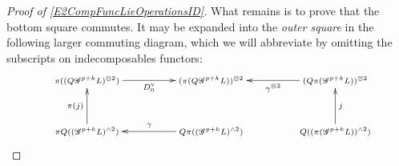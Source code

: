 \documentclass[11pt]{amsart}
\theoremstyle{plain}
\theoremstyle{definition}
\newcommand{\scrG}{\mathscr{G}}
\newcommand{\calW}{\mathcal{W}}
\theoremstyle{plain}
\newcommand{\BSW}{{\scrG}}
\begin{document}
\begin{Composite functor spectral sequences}
\begin{tricky proofs of operation compatibilities}
\begin{proof}[Proof of \ref{E2CompFuncLieOperationsID}]
What remains is to prove that the bottom square commutes. It may be expanded into the \emph{outer square} in the following larger commuting diagram, which we will abbreviate by omitting the subscripts on indecomposables functors:
\[
\def\objectstyle{\scriptstyle}
\xymatrix@R=8mm@C=13mm@!0{
&%
\pi((Q\BSW^{p+k}L)^{\otimes2}) \ar[rrr]_-{D_0^{\textup{v}}}
&%
&%
&%
(\pi (Q\BSW^{p+k}L))^{\otimes2}&%
&%
&%
(Q\pi(\BSW^{p+k}L))^{\otimes2} \ar[lll]^-{\gamma^{\otimes2}}\\\\%
&%
\pi Q((\BSW^{p+k}L)^{\wedge 2})\ar[uu]^-{\pi(j)}
&%
&%
&%
Q\pi((\BSW^{p+k}L)^{\wedge 2})\ar[lll]_-{\gamma}
&%
&%
&%
Q((\pi( \BSW^{p+k}L))^{\wedge 2})
\ar[uu]_-{j}
}\]
\end{proof}
\end{tricky proofs of operation compatibilities}
\end{Composite functor spectral sequences}
\end{document}
